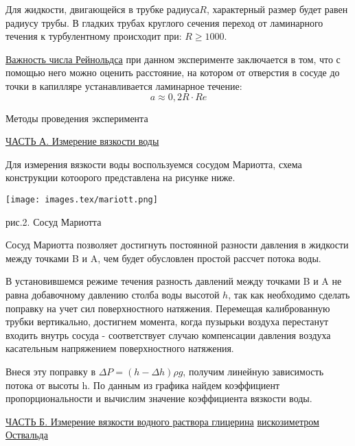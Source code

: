 \documentclass{article}
\begin{document}
Для жидкости, двигающейся в трубке радиуса\(R\), характерный размер будет равен радиусу трубы. В гладких трубах круглого сечения переход от ламинарного течения к турбулентному происходит при: \(R \geqslant 1000.\)

\underline{Важность числа Рейнольдса} при данном эксперименте заключается в том, что с помощью него можно оценить расстояние, на котором от отверстия в сосуде до точки в капилляре устанавливается ламинарное течение:
\begin{equation}
    a \approx 0,2 R\cdot Re
\end{equation}

\begin{center}
    \raggedleft
    {
        \LARGE {Методы проведения эксперимента}
    }
    \hline
    \hline
\end{center}

\begin{center}
    \large{\underline{ЧАСТЬ А. Измерение вязкости воды}}
\end{center}

Для измерения вязкости воды воспользуемся сосудом Мариотта, схема конструкции котоорого представлена на рисунке ниже.
\begin{center}
    \texttt{[image: images.tex/mariott.png]}

    рис.2. Сосуд Мариотта
\end{center}

Сосуд Мариотта позволяет достигнуть постоянной разности давления в жидкости между точками B и A, чем будет обусловлен простой рассчет потока воды.

В установившемся режиме течения разность давлений между точками B и A не равна добавочному давлению столба воды высотой \(h\), так как необходимо сделать поправку на учет сил поверхностного натяжения. Перемещая калиброванную трубки вертикально, достигнем момента, когда пузырьки воздуха перестанут входить внутрь сосуда - соответствует случаю компенсации давления воздуха касательным напряжением поверхностного натяжения.

Внеся эту поправку в \(\Delta P = (h - \Delta h) \rho g\), получим линейную зависимость потока от высоты h. По данным из графика найдем коэффициент пропорциональности и вычислим значение коэффициента вязкости воды.

\begin{center}
    \large{\underline{ЧАСТЬ Б. Измерение вязкости водного раствора глицерина}} \large{\underline{вискозиметром Оствальда}}
\end{center}
\end{document}
